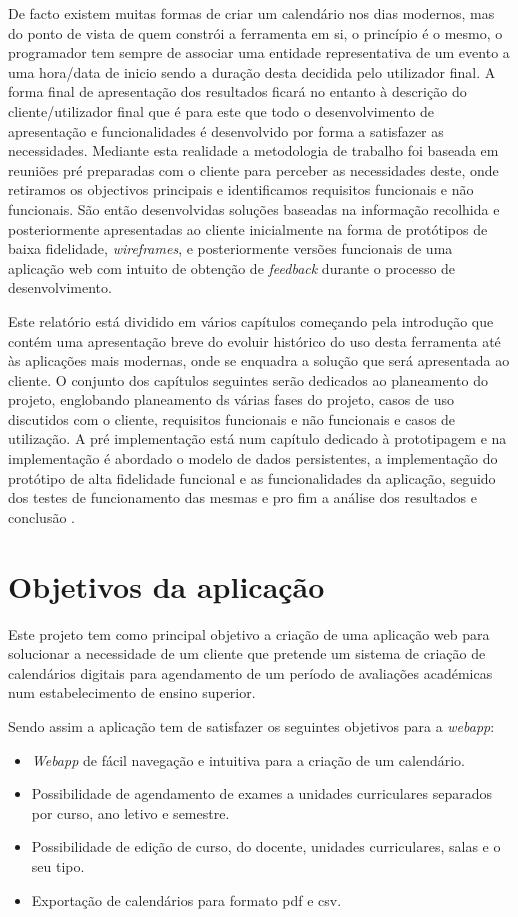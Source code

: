 \documentclass[11pt, twoside]{report}
\begin{document}
	De facto existem muitas formas de criar um calendário nos dias modernos, mas do ponto de vista de quem constrói a ferramenta em si, o princípio é o mesmo, o programador tem sempre de associar uma entidade representativa de um evento a uma hora/data de inicio sendo a duração desta decidida pelo utilizador final. 
	A forma final de apresentação dos resultados ficará no entanto à descrição do cliente/utilizador final que é para este que todo o desenvolvimento de apresentação e funcionalidades é desenvolvido por forma a satisfazer as necessidades.
	Mediante esta realidade a metodologia de trabalho foi baseada em reuniões pré preparadas com o cliente para perceber as necessidades deste, onde retiramos os objectivos principais e identificamos requisitos funcionais e não funcionais.
	São então desenvolvidas soluções baseadas na informação recolhida e posteriormente apresentadas ao cliente inicialmente na forma de protótipos de baixa fidelidade, \textit{wireframes}, e posteriormente versões funcionais de uma aplicação web com intuito de obtenção de \textit{feedback} durante o processo de desenvolvimento.
	
	Este relatório está dividido em vários capítulos começando pela introdução que contém uma apresentação breve do evoluir histórico do uso desta ferramenta até às aplicações mais modernas, onde se enquadra a solução que será apresentada ao cliente.
	O conjunto dos capítulos seguintes serão dedicados ao planeamento do projeto, englobando planeamento ds várias fases do projeto, casos de uso discutidos com o cliente, requisitos funcionais e não funcionais e casos de utilização.
	A pré implementação está num capítulo dedicado à prototipagem e na implementação é abordado o modelo de dados persistentes, a implementação do protótipo de alta fidelidade funcional e as funcionalidades da aplicação, seguido dos testes de funcionamento das mesmas e pro fim a análise dos resultados e conclusão .
	
	\section{Objetivos da aplicação}
	
	Este projeto tem como principal objetivo a criação de uma aplicação web para solucionar a necessidade de um cliente que pretende um sistema de criação de calendários digitais para agendamento de um período de avaliações académicas num estabelecimento de ensino superior. 
	
	Sendo assim a aplicação tem de satisfazer os seguintes objetivos para a \textit{webapp}: 
	\begin{itemize} 
		\item \textit{Webapp} de fácil navegação e intuitiva para a criação de um calendário. 
		\item Possibilidade de agendamento de exames a unidades curriculares separados por curso, ano letivo e semestre.   
		\item Possibilidade de edição de curso, do docente, unidades curriculares, salas e o seu tipo. 
		\item Exportação de calendários para formato pdf e csv. 
	\end{itemize} 
\end{document}
